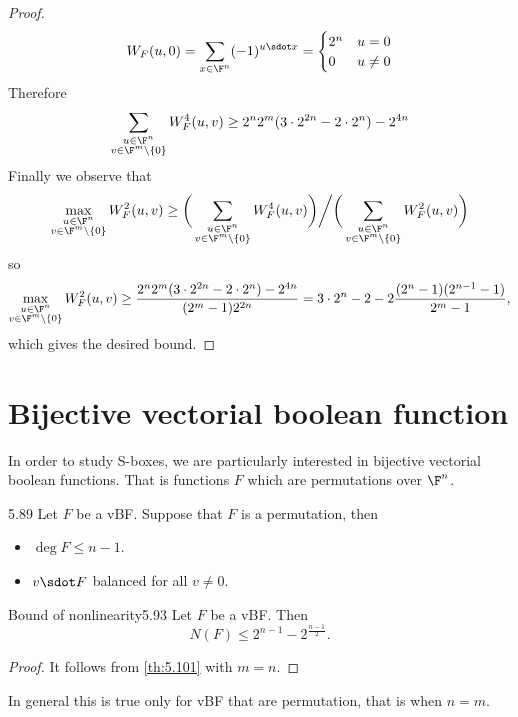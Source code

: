 \begin{proof}
	\[
		W_F(u,0) = \sum_{x\in\F^n}(-1)^{u\sdot x} =
		\begin{cases}
			2^n & u=0       \\
			0   & u \neq 0
		\end{cases}
	\]
	Therefore
	\[
		\sum_{\substack{u\in\F^n\\v\in\F^m\setminus\{0\}}}W_F^4(u,v) \ge 2^n2^m (3\cdot 2^{2n}-2\cdot 2^n) - 2^{4n}
	\]
	Finally we observe that
	\[
		\max_{\substack{u\in\F^n\\v\in\F^m\setminus\{0\}}}W_F^2(u,v) \ge \bigg(\sum_{\substack{u\in\F^n\\v\in\F^m\setminus\{0\}}}W_F^4(u,v)\bigg) \bigg/ \bigg(\sum_{\substack{u\in\F^n\\v\in\F^m\setminus\{0\}}}W_F^2(u,v)\bigg)
	\]
	so
	\[
		\max_{\substack{u\in\F^n\\v\in\F^m\setminus\{0\}}}W_F^2(u,v) \ge \frac{ 2^n2^m (3\cdot 2^{2n}-2\cdot 2^n) - 2^{4n}}{(2^m-1)2^{2n}} = 3\cdot 2^n -2-2 \frac{(2^n-1)(2^{n-1}-1)}{2^m-1},
	\]
	which gives the desired bound.
\end{proof}


\section{Bijective vectorial boolean function}

In order to study S-boxes, we are particularly interested in bijective vectorial boolean functions. That is functions \(F\) which are permutations over \(\F^n\).

\begin{teor}{}{5.89}
	Let \(F\) be a vBF. Suppose that \(F\) is a permutation, then
	\begin{itemize}
		\item \(\deg F \le n-1\).
		\item \(v\sdot F\) balanced for all \(v \neq 0\).
	\end{itemize}
\end{teor}

\begin{teor}{Bound of nonlinearity}{5.93}
	Let \(F\) be a vBF. Then
	\[
		N(F) \le 2^{n-1}-2^{\frac{n-1}{2}}.
	\]
\end{teor}

\begin{proof}
	It follows from \autoref{th:5.101} with \(m=n\).
\end{proof}

\begin{oss}
	In general this is true only for vBF that are permutation, that is when \(n=m\).
\end{oss}


